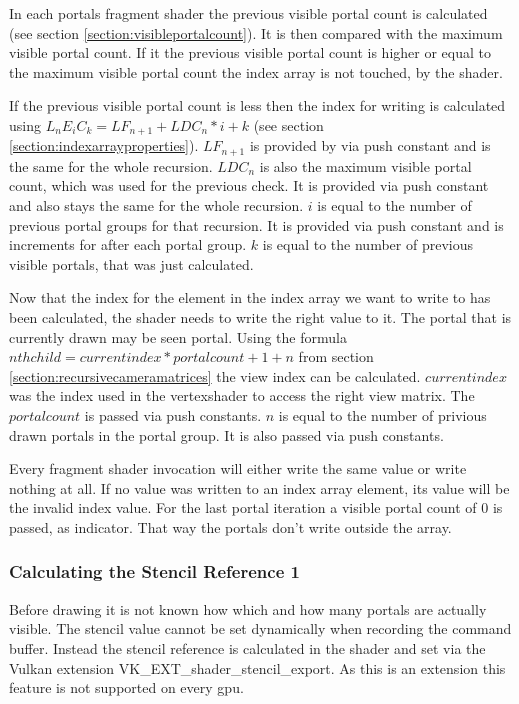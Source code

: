 In each portals fragment shader the previous visible portal count is calculated (see section \ref{section:visibleportalcount}). It is then compared with the maximum visible portal count. If it the previous visible portal count is higher or equal to the maximum visible portal count the index array is not touched, by the shader.

If the previous visible portal count is less then the index for writing is calculated using $L_nE_iC_k = LF_{n+1} + LDC_{n} * i + k$ (see section \ref{section:indexarrayproperties}). $LF_{n+1}$ is provided by via push constant and is the same for the whole recursion.  $LDC_{n}$ is also the maximum visible portal count, which was used for the previous check. It is provided via push constant and also stays the same for the whole recursion. $i$ is equal to the number of previous portal groups for that recursion. It is provided via push constant and is increments for after each portal group. $k$ is equal to the number of previous visible portals, that was just calculated.

Now that the index for the element in the index array we want to write to has been calculated, the shader needs to write the right value to it. The portal that is currently drawn may be seen portal. Using the formula  $ nth child = current index * portalcount + 1 + n$ from section \ref{section:recursivecameramatrices} the view index can be calculated.  $currentindex$ was the index used in the vertexshader to access the right view matrix. The $portalcount$ is passed via push constants. $n$ is equal to the number of privious drawn portals in the portal group. It is also passed via push constants.

Every fragment shader invocation will either write the same value or write nothing at all. If no value was written to an index array element, its value will be the invalid index value. For the last portal iteration a visible portal count of 0 is passed, as indicator. That way the portals don't write outside the array.

\subsubsection{Calculating the Stencil Reference 1}
Before drawing it is not known how which and how many portals are actually visible. The stencil value cannot be set dynamically when recording the command buffer. Instead the stencil reference is calculated in the shader and set via the Vulkan extension VK\_EXT\_shader\_stencil\_export. As this is an extension this feature is not supported on every \gls{gpu}.

